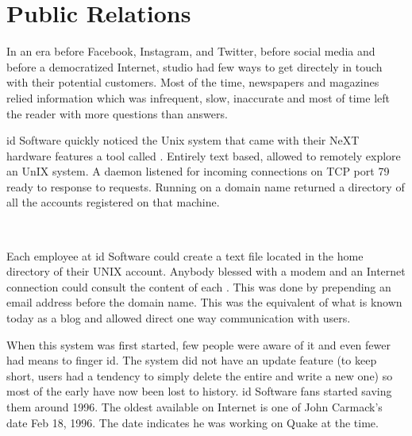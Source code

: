 \section{Public Relations}
In an era before Facebook, Instagram, and Twitter, before social media and before a democratized Internet, studio had few ways to get directely in touch with their potential customers. Most of the time, newspapers and magazines relied information which was infrequent, slow, inaccurate and most of time left the reader with more questions than answers.\\
\par
id Software quickly noticed the Unix system that came with their NeXT hardware features a tool called . Entirely text based,  allowed to remotely explore an UnIX system. A  daemon listened for incoming connections on TCP port 79 ready to response to requests. Running  on a domain name returned a directory of all the accounts registered on that machine.\\
\par
{}
\par
{}\\
\par

Each employee at id Software could create a  text file located in the home directory of their UNIX account. Anybody blessed with a modem and an Internet connection could consult the content of each . This was done by prepending an email address before the domain name. This was the equivalent of what is known today as a blog and allowed direct one way communication with users.\\
\par
When this system was first started, few people were aware of it and even fewer had means to finger id. The system did not have an update feature (to keep  short, users had a tendency to simply delete the entire  and write a new one) so most of the early  have now been lost to history. id Software fans started saving them around 1996. The oldest available on Internet is one of John Carmack's date Feb 18, 1996. The date indicates he was working on Quake at the time.\\
\par
{}


